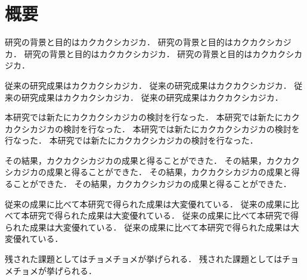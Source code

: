 \chapter{概要}
研究の背景と目的はカクカクシカジカ．
研究の背景と目的はカクカクシカジカ．
研究の背景と目的はカクカクシカジカ．
研究の背景と目的はカクカクシカジカ．

従来の研究成果はカクカクシカジカ．
従来の研究成果はカクカクシカジカ．
従来の研究成果はカクカクシカジカ．
従来の研究成果はカクカクシカジカ．

本研究では新たにカクカクシカジカの検討を行なった．
本研究では新たにカクカクシカジカの検討を行なった．
本研究では新たにカクカクシカジカの検討を行なった．
本研究では新たにカクカクシカジカの検討を行なった．

その結果，カクカクシカジカの成果と得ることができた．
その結果，カクカクシカジカの成果と得ることができた．
その結果，カクカクシカジカの成果と得ることができた．
その結果，カクカクシカジカの成果と得ることができた．

従来の成果に比べて本研究で得られた成果は大変優れている．
従来の成果に比べて本研究で得られた成果は大変優れている．
従来の成果に比べて本研究で得られた成果は大変優れている．
従来の成果に比べて本研究で得られた成果は大変優れている．

残された課題としてはチョメチョメが挙げられる．
残された課題としてはチョメチョメが挙げられる．
